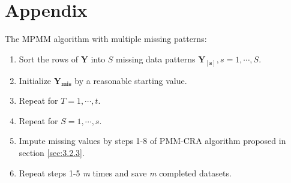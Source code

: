 	\section*{Appendix}
	The MPMM algorithm with multiple missing patterns:
	\begin{enumerate}
		\item Sort the rows of $\boldsymbol{Y}$ into $S$ missing data patterns $\boldsymbol{Y_{[s]}}, s=1,\cdots,S$.
		\item Initialize $\boldsymbol{Y_{mis}}$ by a reasonable starting value.
		\item Repeat for $T=1,\cdots,t$.
		\item Repeat for $S=1,\cdots,s$.
		\item Impute missing values by steps 1-8 of PMM-CRA algorithm proposed in section \ref{sec:3.2.3}.
		\item Repeat steps 1-5 \emph{m} times and save \emph{m} completed datasets.
	\end{enumerate} 
	
	

	


